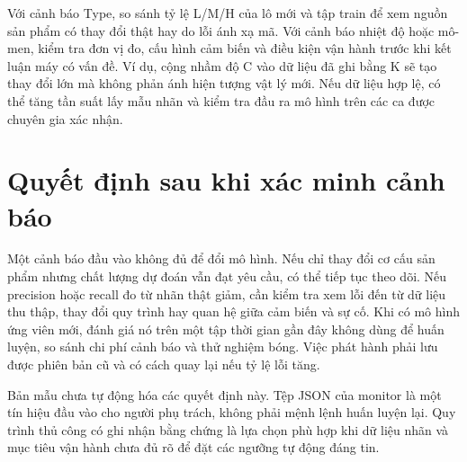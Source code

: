 Với cảnh báo Type, so sánh tỷ lệ L/M/H của lô mới và tập train để xem nguồn sản phẩm có thay đổi thật hay do lỗi ánh xạ mã. Với cảnh báo nhiệt độ hoặc mô-men, kiểm tra đơn vị đo, cấu hình cảm biến và điều kiện vận hành trước khi kết luận máy có vấn đề. Ví dụ, cộng nhầm độ C vào dữ liệu đã ghi bằng K sẽ tạo thay đổi lớn mà không phản ánh hiện tượng vật lý mới. Nếu dữ liệu hợp lệ, có thể tăng tần suất lấy mẫu nhãn và kiểm tra đầu ra mô hình trên các ca được chuyên gia xác nhận.

\section{Quyết định sau khi xác minh cảnh báo}
Một cảnh báo đầu vào không đủ để đổi mô hình. Nếu chỉ thay đổi cơ cấu sản phẩm nhưng chất lượng dự đoán vẫn đạt yêu cầu, có thể tiếp tục theo dõi. Nếu precision hoặc recall đo từ nhãn thật giảm, cần kiểm tra xem lỗi đến từ dữ liệu thu thập, thay đổi quy trình hay quan hệ giữa cảm biến và sự cố. Khi có mô hình ứng viên mới, đánh giá nó trên một tập thời gian gần đây không dùng để huấn luyện, so sánh chi phí cảnh báo và thử nghiệm bóng. Việc phát hành phải lưu được phiên bản cũ và có cách quay lại nếu tỷ lệ lỗi tăng.

Bản mẫu chưa tự động hóa các quyết định này. Tệp JSON của monitor là một tín hiệu đầu vào cho người phụ trách, không phải mệnh lệnh huấn luyện lại. Quy trình thủ công có ghi nhận bằng chứng là lựa chọn phù hợp khi dữ liệu nhãn và mục tiêu vận hành chưa đủ rõ để đặt các ngưỡng tự động đáng tin.

